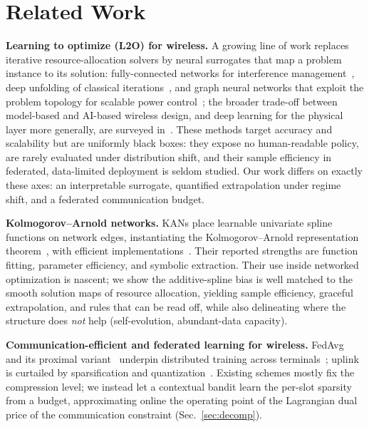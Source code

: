 \documentclass[journal]{IEEEtran}
\begin{document}
\section{Related Work}
\textbf{Learning to optimize (L2O) for wireless.} A growing line of work replaces
iterative resource-allocation solvers by neural surrogates that map a problem
instance to its solution: fully-connected networks for interference
management~\cite{sun2018l2o}, deep unfolding of classical
iterations~\cite{balatsoukas2019unfolding}, and graph neural networks that exploit
the problem topology for scalable power control~\cite{shen2021gnn,eisen2020rgnn};
the broader trade-off between model-based and AI-based wireless design, and deep
learning for the physical layer more generally, are surveyed
in~\cite{zappone2019ai,oshea2017physical,lu2020amc}.
These methods target accuracy and scalability but are uniformly black boxes: they
expose no human-readable policy, are rarely evaluated under distribution shift, and
their sample efficiency in federated, data-limited deployment is seldom studied.
Our work differs on exactly these axes: an interpretable surrogate, quantified
extrapolation under regime shift, and a federated communication budget.

\textbf{Kolmogorov--Arnold networks.} KANs place learnable univariate spline
functions on network edges, instantiating the Kolmogorov--Arnold representation
theorem~\cite{kolmogorov1957,liu2024kan}, with efficient
implementations~\cite{blealtan2024efficientkan}. Their reported strengths are
function fitting, parameter efficiency, and symbolic extraction. Their use inside
networked optimization is nascent; we show the additive-spline bias is well matched
to the smooth solution maps of resource allocation, yielding sample efficiency,
graceful extrapolation, and rules that can be read off, while also delineating
where the structure does \emph{not} help (self-evolution, abundant-data capacity).

\textbf{Communication-efficient and federated learning for wireless.}
FedAvg~\cite{mcmahan2017fedavg} and its proximal variant~\cite{li2020fedprox}
underpin distributed training across terminals~\cite{niknam2020flwireless,amiri2020federated};
uplink is curtailed by sparsification and quantization~\cite{konecny2016fedcomm,shi2023kanfl}. Existing
schemes mostly fix the compression level; we instead let a contextual bandit learn
the per-slot sparsity from a budget, approximating online the operating point of the Lagrangian dual price of
the communication constraint (Sec.~\ref{sec:decomp}).
\end{document}
